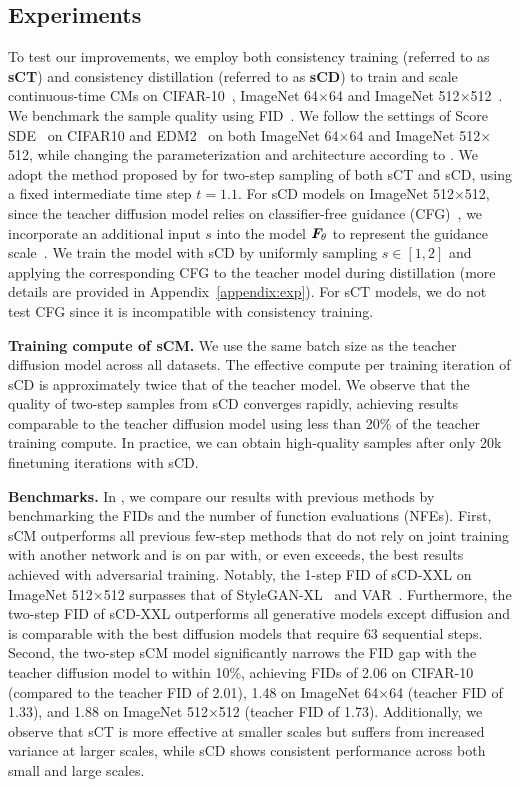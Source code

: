 \subsection{Experiments}
To test our improvements, we employ both consistency training (referred to as \textbf{sCT}) and consistency distillation (referred to as \textbf{sCD}) to train and scale continuous-time CMs on CIFAR-10~\citep{Krizhevsky09cifar10}, ImageNet 64$\times$64 and ImageNet 512$\times$512~\citep{deng2009imagenet}. We benchmark the sample quality using FID~\citep{heusel2017gans}. We follow the settings of Score SDE~\citep{song2020score} on CIFAR10 and EDM2~\citep{karras2024edm2} on both ImageNet 64$\times$64 and ImageNet 512$\times$512, while changing the parameterization and architecture according to . We adopt the method proposed by \citet{song2023cm} for two-step sampling of both sCT and sCD, using a fixed intermediate time step $t=1.1$. For sCD models on ImageNet 512$\times$512, since the teacher diffusion model relies on classifier-free guidance (CFG)~\citep{ho2021classifier}, we incorporate an additional input $s$ into the model ${\bm{F}}_\theta$ to represent the guidance scale~\citep{meng2023distillation}. We train the model with sCD by uniformly sampling $s\in[1,2]$ and applying the corresponding CFG to the teacher model during distillation (more details are provided in Appendix~\ref{appendix:exp}). For sCT models, we do not test CFG since it is incompatible with consistency training. 

\textbf{Training compute of sCM. }
We use the same batch size as the teacher diffusion model across all datasets. The effective compute per training iteration of sCD is approximately twice that of the teacher model. We observe that the quality of two-step samples from sCD converges rapidly, achieving results comparable to the teacher diffusion model using less than 20\% of the teacher training compute. In practice, we can obtain high-quality samples after only 20k finetuning iterations with sCD.

\textbf{Benchmarks. }
In , we compare our results with previous methods by benchmarking the FIDs and the number of function evaluations (NFEs). First, sCM outperforms all previous few-step methods that do not rely on joint training with another network and is on par with, or even exceeds, the best results achieved with adversarial training. Notably, the 1-step FID of sCD-XXL on ImageNet 512$\times$512 surpasses that of StyleGAN-XL~\citep{sauer2022stylegan-xl} and VAR~\citep{tian2024VAR}. Furthermore, the two-step FID of sCD-XXL outperforms all generative models except diffusion and is comparable with the best diffusion models that require $63$ sequential steps. Second, the two-step sCM model significantly narrows the FID gap with the teacher diffusion model to within 10\%, achieving FIDs of 2.06 on CIFAR-10 (compared to the teacher FID of 2.01), 1.48 on ImageNet 64×64 (teacher FID of 1.33), and 1.88 on ImageNet 512×512 (teacher FID of 1.73). Additionally, we observe that sCT is more effective at smaller scales but suffers from increased variance at larger scales, while sCD shows consistent performance across both small and large scales.

